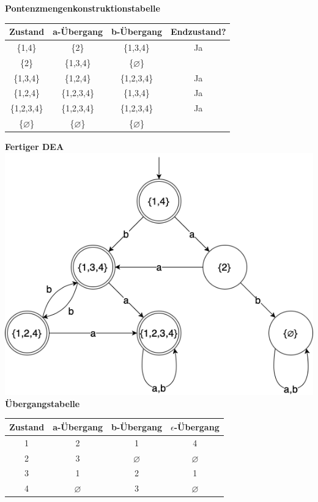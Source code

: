 	\textbf{Pontenzmengenkonstruktionstabelle}
	
	\begin{tabular}{|c|c|c|c|}
		\hline
		\textbf{Zustand} & \textbf{a-Übergang} & \textbf{b-Übergang} & \textbf{Endzustand?} \\
		\hline
		\{1,4\}     & \{2\}       & \{1,3,4\}         & Ja \\
		\hline
		\{2\}       & \{1,3,4\}   & \{$\varnothing$\} &    \\
		\hline
		\{1,3,4\}   & \{1,2,4\}   & \{1,2,3,4\}       & Ja \\
		\hline
		\{1,2,4\}   & \{1,2,3,4\} & \{1,3,4\}         & Ja \\
		\hline
		\{1,2,3,4\} & \{1,2,3,4\} & \{1,2,3,4\}       & Ja \\
		\hline
		\{$\varnothing$\}       & \{$\varnothing$\}   & \{$\varnothing$\} &    \\
		\hline
	\end{tabular}	
	
	\textbf{Fertiger DEA} \\
	
	\includegraphics[scale=0.5]{NEA-DEA}
	\textbf{Übergangstabelle}
	
	\begin{tabular}{|c|c|c|c|}
		\hline
		\textbf{Zustand}  & \textbf{a-Übergang} & \textbf{b-Übergang} & \textbf{$\epsilon$-Übergang} \\
		\hline
		1                 & 2                   & 1                   & 4 \\
		\hline
		2                 & 3                   & $\varnothing$       & $\varnothing$ \\
		\hline
		3                 & 1                   & 2                   & 1 \\
		\hline
		4                 & $\varnothing$       & 3                   & $\varnothing$ \\
		\hline
	\end{tabular}
	
